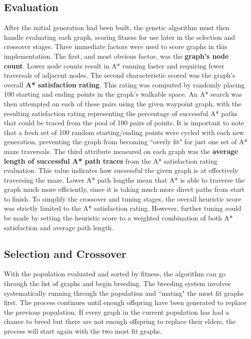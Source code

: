 	\subsection{Evaluation}
	After the initial generation had been built, the genetic algorithm must then handle evaluating each graph, scoring fitness for use later in the selection and crossover stages. Three immediate factors were used to score graphs in this implementation. The first, and most obvious factor, was the \textbf{graph's node count}. Lower node counts result in A* running faster and requiring fewer traversals of adjacent nodes. The second characteristic scored was the graph's overall \textbf{A* satisfaction rating}. This rating was computed by randomly placing 100 starting and ending points in the graph's walkable space. An A* search was then attempted on each of these pairs using the given waypoint graph, with the resulting satisfaction rating representing the percentage of successful A* paths that could be traced from the pool of 100 pairs of points. It is important to note that a fresh set of 100 random starting/ending points were cycled with each new generation, preventing the graph from becoming ``overly fit" for just one set of A* maze traversals. The third attribute measured on each graph was the \textbf{average length of successful A* path traces} from the A* satisfaction rating evaluation. This value indicates how successful the given graph is at effectively traversing the maze. Lower A* path lengths mean that A* is able to traverse the graph much more efficiently, since it is taking much more direct paths from start to finish. To simplify the crossover and tuning stages, the overall heuristic score was strictly limited to the A* satisfaction rating. However, further tuning could be made by setting the heuristic score to a weighted combination of both A* satisfaction and average path length.
	
	\subsection{Selection and Crossover}
	With the population evaluated and sorted by fitness, the algorithm can go through the list of graphs and begin breeding. The breeding system involves systematically running through the population and ``mating" the most fit graphs first. The process continues until enough offspring have been generated to replace the previous population. If every graph in the current population has had a chance to breed but there are not enough offspring to replace their elders, the process will start again with the two most fit graphs.
	
